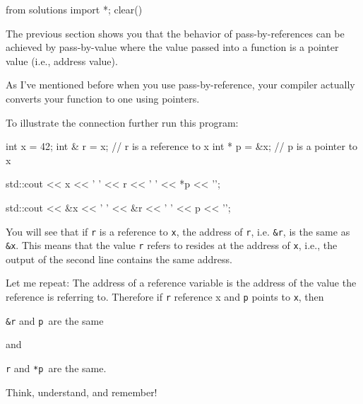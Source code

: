 \begin{python0}
from solutions import *; clear()
\end{python0}

The previous section shows you that the behavior of pass-by-references can be achieved by pass-by-value where the value passed into a function is a pointer value (i.e., address value).

As I've mentioned before when you use pass-by-reference, your compiler actually converts your function to one using pointers.

To illustrate the connection further run this program:

\begin{consolethree}[escapeinside=||]
int x = 42;
int & r = x;    // r is a reference to x
int * p = &x;   // p is a pointer to x

std::cout << x << ' ' << r << ' ' << *p << '\n';

std::cout << &x << ' ' << &r << ' ' << p << '\n';
\end{consolethree}
You will see that if \texttt{r} is a reference to \texttt{x}, the address of \texttt{r}, i.e. \texttt{\&r}, is the same as \texttt{\&x}. This means that the value \texttt{r} refers to resides at the address of \texttt{x}, i.e., the output of the second line contains the same address.

Let me repeat: The address of a reference variable is the address of the value the reference is referring to. Therefore if \texttt{r} reference x and \texttt{p} points to \texttt{x}, then

\texttt{\&r} and \texttt{p }are the same

and

\texttt{r} and \texttt{*p }are the same.

Think, understand, and remember!


